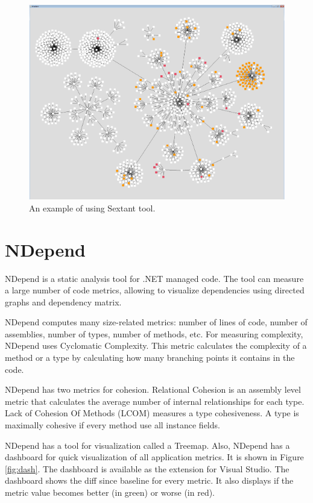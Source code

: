\begin{figure}[ht]
	\centering
	\includegraphics[width=\textwidth]{figures/1.png}
	\caption{An example of using Sextant tool.}
	\label{fig:1}
\end{figure}

\section{NDepend}

NDepend is a static analysis tool for .NET managed code. The tool can measure a large number of code metrics, allowing to visualize dependencies using directed graphs and dependency matrix.  

NDepend computes many size-related metrics: number of lines of code, number of assemblies, number of types, number of methods, etc. For measuring complexity, NDepend uses Cyclomatic Complexity. This metric calculates the complexity of a method or a type by calculating how many branching points it contains in the code.

NDepend has two metrics for cohesion. Relational Cohesion is an assembly level metric that calculates the average number of internal relationships for each type. Lack of Cohesion Of Methods (LCOM) measures a type cohesiveness. A type is maximally cohesive if every method use all instance fields.

NDepend has a tool for visualization called a Treemap. Also, NDepend has a dashboard for quick visualization of all application metrics. It is shown in Figure \ref{fig:dash}. The dashboard is available as the extension for Visual Studio. The dashboard shows the diff since baseline for every metric. It also displays if the metric value becomes better (in green) or worse (in red). 


